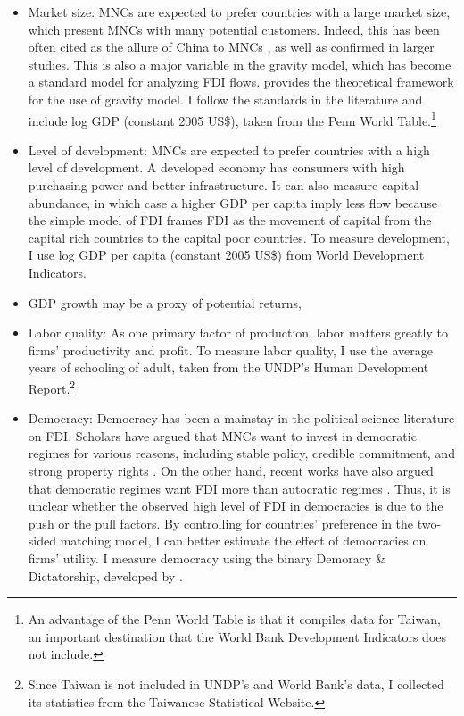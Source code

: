 \begin{itemize}
\item Market size: MNCs are expected to prefer countries with a large market
size, which present MNCs with many potential customers. Indeed, this has been
often cited as the allure of China to MNCs \citep{Luo2010}, as well as confirmed
in larger studies. This is also a major variable in the gravity model, which has
become a standard model for analyzing FDI flows. \citet{Bergstrand2007} provides
the theoretical framework for the use of gravity model. I follow the standards
in the literature and include log GDP (constant 2005 US\$), taken from the Penn
World Table.\footnote{An advantage of the Penn World Table is that it compiles
data for Taiwan, an important destination that the World Bank Development
Indicators does not include.}

\item Level of development: MNCs are expected to prefer countries with a high
level of development. A developed economy has consumers with high purchasing
power and better infrastructure. It can also measure capital abundance, in which
case a higher GDP per capita imply less flow because the simple model of FDI
frames FDI as the movement of capital from the capital rich countries to the
capital poor countries. To measure development, I use log GDP per capita
(constant 2005 US\$) from World Development Indicators.

\item GDP growth may be a proxy of potential returns,

\item Labor quality: As one primary factor of production, labor matters greatly
to firms' productivity and profit. To measure labor quality, I use the average
years of schooling of adult, taken from the UNDP's Human Development
Report.\footnote{Since Taiwan is not included in UNDP's and World Bank's data, I
collected its statistics from the Taiwanese Statistical Website.}

\item Democracy: Democracy has been a mainstay in the political science
literature on FDI. Scholars have argued that MNCs want to invest in democratic
regimes for various reasons, including stable policy, credible commitment, and
strong property rights \citep{Ahlquist2006, Li2003, Jensen2003}. On the other
hand, recent works have also argued that democratic regimes want FDI more than
autocratic regimes \citep{Pandya2016}. Thus, it is unclear whether the observed
high level of FDI in democracies is due to the push or the pull factors. By
controlling for countries' preference in the two-sided matching model, I can
better estimate the effect of democracies on firms' utility. I measure democracy
using the binary Demoracy \& Dictatorship, developed by \citet{Cheibub2009b}.
\end{itemize}

